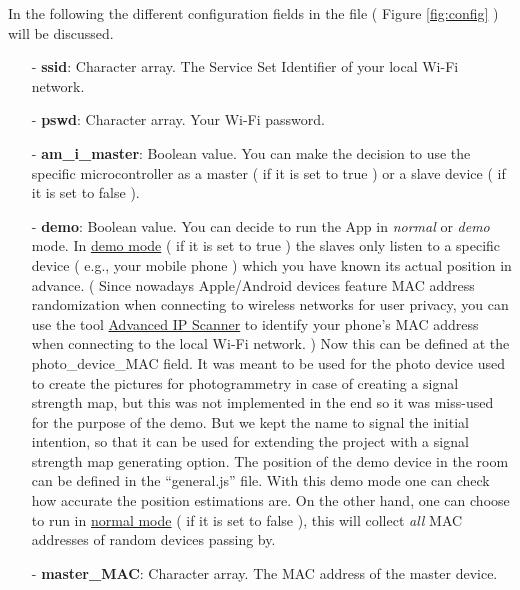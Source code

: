 \documentclass[11pt,a4paper]{article}
\begin{document}
In the following the different configuration fields in the file ( Figure \ref{fig:config} ) will be discussed.

\begin{itemize}
\setlength{\itemsep}{0pt}
\setlength{\parsep}{0pt}
\setlength{\parskip}{0pt}

\item[-] \textbf{ssid}: Character array. The Service Set Identifier of your local Wi-Fi network.\\

\item[-] \textbf{pswd}: Character array. Your Wi-Fi password.\\

\item[-] \textbf{am\_i\_master}:  Boolean value. You can make the decision to use the specific microcontroller as a master ( if it is set to true ) or a slave device ( if it is set to false ).

\newpage

\item[-] \textbf{demo}: Boolean value. You can decide to run the App in \emph{normal} or \emph{demo} mode. In \underline{demo mode} ( if it is set to true ) the slaves only listen to a specific device ( e.g., your mobile phone ) which you have known its actual position in advance. ( Since nowadays Apple/Android devices feature MAC address randomization when connecting to wireless networks for user privacy, you can use the tool \href{https://www.advanced-ip-scanner.com/}{Advanced IP Scanner} to identify your phone's MAC address when connecting to the local Wi-Fi network. ) Now this can be defined at the photo\_device\_MAC field. It was meant to be used for the photo device used to create the pictures for photogrammetry in case of creating a signal strength map, but this was not implemented in the end so it was miss-used for the purpose of the demo. But we kept the name to signal the initial intention, so that it can be used for extending the project with a signal strength map generating option. The position of the demo device in the room can be defined in the ``general.js'' file. With this demo mode one can check how accurate the position estimations are. On the other hand, one can choose to run in \underline{normal mode} ( if it is set to false ), this will collect \emph{all} MAC addresses of random devices passing by.\\

\item[-] \textbf{master\_MAC}: Character array. The MAC address of the master device.\\


\end{itemize}
\end{document}
